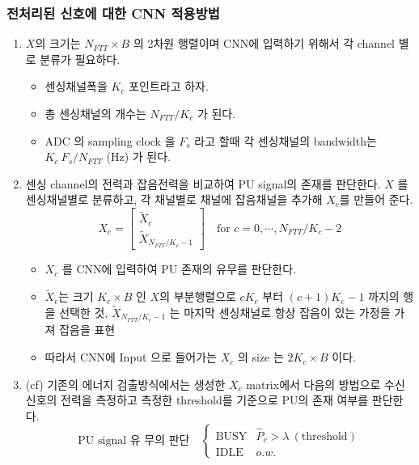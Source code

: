 \subsubsection*{전처리된 신호에 대한 CNN 적용방법}
\begin{enumerate}
    \item $X$의 크기는 $N_{FTT} \times B$ 의 2차원 행렬이며 CNN에 입력하기 위해서 각 channel 별로 분류가 필요하다. 
        \begin{itemize}
            \item 센싱채널폭을 $K_c$ 포인트라고 하자.
            \item 총 센싱채널의 개수는 $N_{FTT} / K_c$ 가 된다. 
            \item ADC 의 sampling clock 을 $F_s$ 라고 할때 각 센싱채널의 bandwidth는 $K_c\ F_s / N_{FTT}$ (Hz) 가 된다.
        \end{itemize}
    \item 센싱 channel의 전력과 잡음전력을 비교하여 PU signal의 존재를 판단한다.  $X$ 를 센싱채널별로 분류하고, 각 채널별로 채널에 잡음채널을 추가해 $X_c$를 만들어 준다. 
        $$
        X_c = 
        \left [
        \begin{matrix}
        \tilde{X}_c \\
        \tilde{X}_{N_{FTT} / K_c -1}
        \end{matrix}
        \right] \quad
        \text{for } c = 0, \cdots, N_{FTT}/K_c -2
        $$
        \begin{itemize}
            \item $X_c$ 를 CNN에 입력하여 PU 존재의 유무를 판단한다. 
            \item $\tilde{X}_c$는 크기 $K_c \times B$ 인 $X$의 부분행렬으로 $c K_c$ 부터 $(c+1) K_c - 1 $ 까지의 행을 선택한 것, $\tilde{X}_{N_{FTT} / K_c -1}$ 는 마지막 센싱채널로 항상 잡음이 있는 가정을 가져 잡음을 표현 
            \item 따라서 CNN에 Input 으로 들어가는 $X_c$ 의 size 는 $2 K_c \times B$  이다. 
        \end{itemize}
    \item (cf) 기존의 에너지 검출방식에서는 생성한 $X_c$ matrix에서 다음의 방법으로  수신신호의 전력을 측정하고 측정한 threshold를 기준으로 PU의 존재 여부를 판단한다. 
        $$
        \text{PU signal 유 무의 판단} \quad
        \begin{cases}
        \text{BUSY} & \hat{P}_c > \lambda\ (\text{threshold})\\
        \text{IDLE} & o.w.
        \end{cases}
$$
\end{enumerate}
